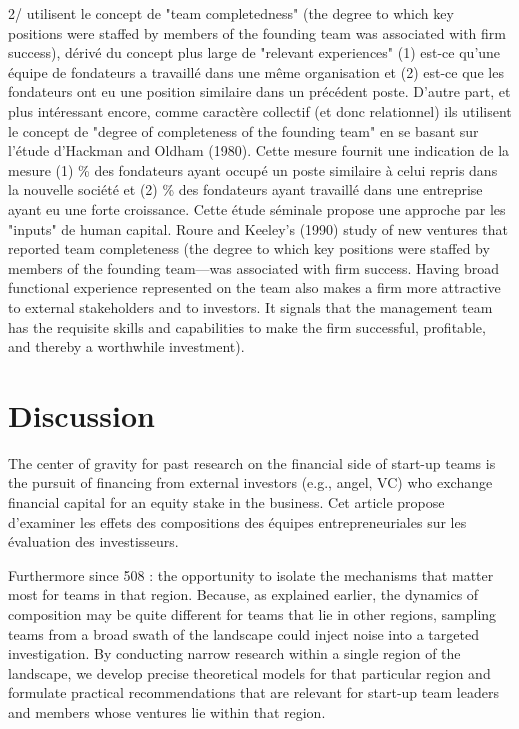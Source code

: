 \documentclass[12pt]{article}
\begin{document}
2/ \citep{roure1986linking, roure1990predictors} utilisent le concept de "team completedness" (the degree to which key positions were staffed by members of the founding team was associated with firm success), dérivé du concept plus large de "relevant experiences" (1) est-ce qu'une équipe de fondateurs a travaillé dans une même organisation et (2) est-ce que les fondateurs ont eu une position similaire dans un précédent poste. D'autre part, et plus intéressant encore, comme caractère collectif (et donc relationnel) ils utilisent le concept de "degree of completeness of the founding team" en se basant sur l'étude d'Hackman and Oldham (1980). Cette mesure fournit une indication de la mesure (1) \% des fondateurs ayant occupé un poste similaire à celui repris dans la nouvelle société et (2) \% des fondateurs ayant travaillé dans une entreprise ayant eu une forte croissance. Cette étude séminale propose une approche par les "inputs" de human capital. Roure and Keeley’s (1990) study of new ventures that reported team completeness (the degree to which key positions were staffed by members of the founding team—was associated with firm success. Having broad functional experience represented on the team also makes a firm more attractive to external stakeholders and to investors. It signals that the management team has the requisite skills and capabilities to make the firm successful, profitable, and thereby a worthwhile investment).

\section{Discussion}

The center of gravity for past research on the financial side of start-up teams is the pursuit of financing from external investors (e.g., angel, VC) who exchange financial capital for an equity stake in the business. Cet article propose d'examiner les effets des compositions des équipes entrepreneuriales sur les évaluation des investisseurs.

Furthermore since 508 : the opportunity to isolate the mechanisms that matter most for teams in that region. Because, as explained earlier, the dynamics of composition may be quite different for teams that lie in other regions, sampling teams from a broad swath of the landscape could inject noise into a targeted investigation. By conducting narrow research within a single region of the landscape, we develop precise theoretical models for that particular region and formulate practical recommendations that are relevant for start-up team leaders and members whose ventures lie within that region. \\
\end{document}
